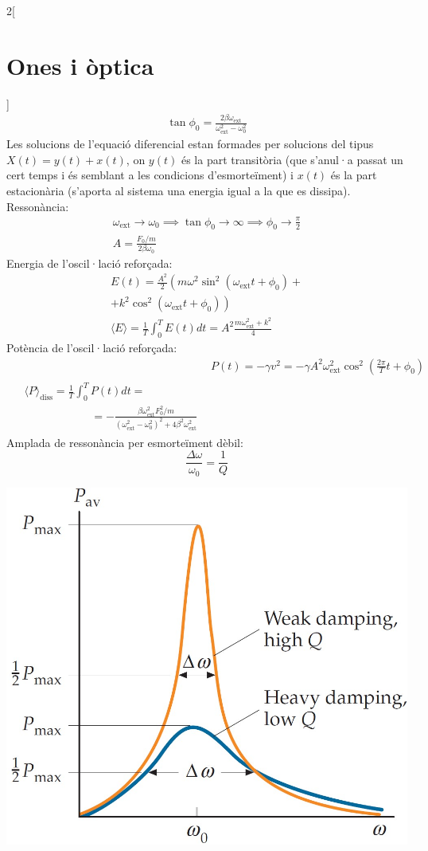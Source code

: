 \documentclass[../../../main.tex]{subfiles}
\begin{document}
\begin{multicols}{2}[\section{Ones i òptica}]
\begin{gather*}
    \tan\phi_0=\frac{2\beta\omega_{\text{ext}}}{\omega_{\text{ext}}^2-\omega_0^2}
\end{gather*}
{\footnotesize Les solucions de l'equació diferencial estan formades per solucions del tipus $X(t)=y(t)+x(t)$, on $y(t)$ és la part transitòria (que s'anul·a passat un cert temps i és semblant a les condicions d'esmorteïment) i $x(t)$ és la part estacionària (s'aporta al sistema una energia igual a la que es dissipa).}\newline
Ressonància:
\begin{gather*}
    \omega_{\text{ext}}\to\omega_0\implies\tan\phi_0\to\infty\implies\phi_0\to\frac{\pi}{2}\\
    A=\frac{F_0/m}{2\beta\omega_0}
\end{gather*}
Energia de l'oscil·lació reforçada:
\begin{multline*}
    E(t)=\frac{A^2}{2}\left(m\omega^2\sin^2(\omega_{\text{ext}}t+\phi_0)+\right.\\\left.+k^2\cos^2(\omega_{\text{ext}}t+\phi_0)\right)\\
    \langle E\rangle=\frac{1}{T}\int_0^TE(t)dt=A^2\frac{m\omega_{\text{ext}}^2+k^2}{4}
\end{multline*}
Potència de l'oscil·lació reforçada:
\begin{align*}
    &P(t)=-\gamma v^2=-\gamma A^2\omega_{\text{ext}}^2\cos^2\left(\frac{2\pi}{T}t+\phi_0\right)\\
    \begin{split}
        &\langle P\rangle_{\text{diss}}=\frac{1}{T}\int_0^TP(t)dt=\\&\qquad\qquad\qquad=-\frac{\beta\omega_\text{ext}^2F_0^2/m}{(\omega_\text{ext}^2-\omega_0^2)^2+4\beta^2\omega_\text{ext}^2}
    \end{split}
\end{align*}
Amplada de ressonància per esmorteïment dèbil:
$$\frac{\Delta\omega}{\omega_0}=\frac{1}{Q}$$
\begin{minipage}{\linewidth}
   \centering
   \includegraphics[width=\linewidth]{Physics/1st/Waves_and_optics/Images/q.jpg}

\end{minipage}
\end{multicols}
\end{document}
